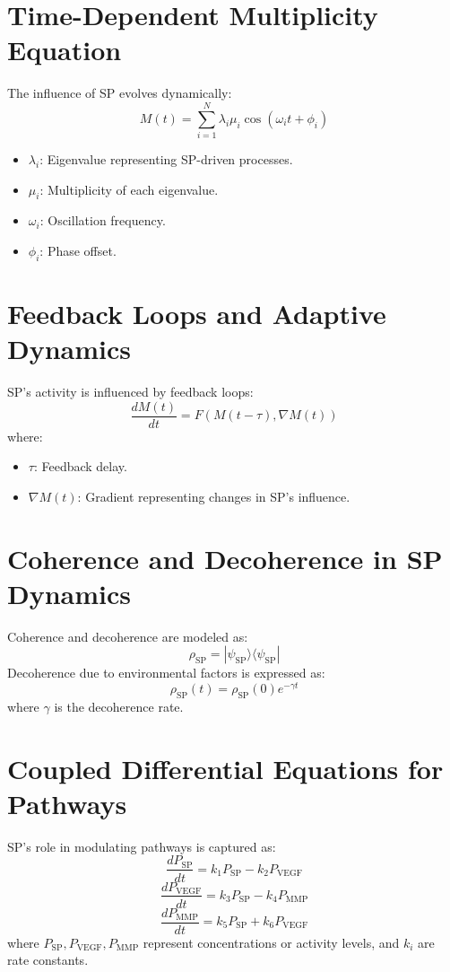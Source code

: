 \documentclass{article}
\begin{document}
\section{Time-Dependent Multiplicity Equation}
The influence of SP evolves dynamically:
\[\
M(t) = \sum_{i=1}^N \lambda_i \mu_i \cos(\omega_i t + \phi_i)
\]
\begin{itemize}
    \item $\lambda_i$: Eigenvalue representing SP-driven processes.
    \item $\mu_i$: Multiplicity of each eigenvalue.
    \item $\omega_i$: Oscillation frequency.
    \item $\phi_i$: Phase offset.
\end{itemize}

\section{Feedback Loops and Adaptive Dynamics}
SP's activity is influenced by feedback loops:
\[\
\frac{dM(t)}{dt} = F(M(t-\tau), \nabla M(t))
\]
where:
\begin{itemize}
    \item $\tau$: Feedback delay.
    \item $\nabla M(t)$: Gradient representing changes in SP's influence.
\end{itemize}

\section{Coherence and Decoherence in SP Dynamics}
Coherence and decoherence are modeled as:
\[\
\rho_{\text{SP}} = |\psi_{\text{SP}}\rangle \langle \psi_{\text{SP}}|
\]
Decoherence due to environmental factors is expressed as:
\[\
\rho_{\text{SP}}(t) = \rho_{\text{SP}}(0) e^{-\gamma t}
\]
where $\gamma$ is the decoherence rate.

\section{Coupled Differential Equations for Pathways}
SP's role in modulating pathways is captured as:
\[\
\frac{dP_{\text{SP}}}{dt} = k_1 P_{\text{SP}} - k_2 P_{\text{VEGF}}
\]
\[\
\frac{dP_{\text{VEGF}}}{dt} = k_3 P_{\text{SP}} - k_4 P_{\text{MMP}}
\]
\[\
\frac{dP_{\text{MMP}}}{dt} = k_5 P_{\text{SP}} + k_6 P_{\text{VEGF}}
\]
where $P_{\text{SP}}, P_{\text{VEGF}}, P_{\text{MMP}}$ represent concentrations or activity levels, and $k_i$ are rate constants.
\end{document}
